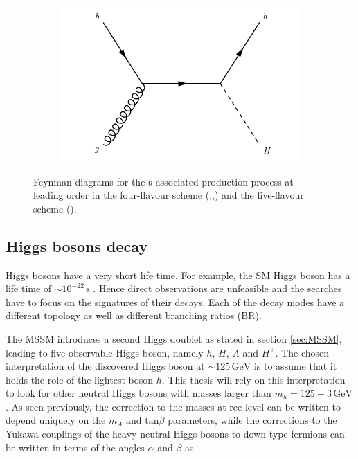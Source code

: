 \begin{figure}
\begin{subfigure}[b]{0.22\textwidth}
  \caption{\label{fig:bbh3}}
\end{subfigure}
\begin{subfigure}[b]{0.22\textwidth}
  \centering
  \includegraphics[width=\textwidth]{Images/bbh4.pdf}
  \caption{\label{fig:bbh4}}
\end{subfigure}%
\caption{Feynman diagrams for the $b$-associated production process at leading order in the four-flavour scheme (,,) and the five-flavour scheme ().}
\label{fig:bbh}
\end{figure}

\subsection{Higgs bosons decay}

Higgs bosons have a very short life time. For example, the SM Higgs boson has a life time of $\sim 10^{-22} \, \mathrm{s}$ \cite{pdg2016}. Hence direct observations are unfeasible and the searches have to focus on the signatures of their decays. Each of the decay modes have a different topology as well as different branching ratios (BR). 

The MSSM introduces a second Higgs doublet as stated in section \ref{sec:MSSM}, leading to five observable Higgs boson, namely $h$, $H$, $A$ and $H^{\pm}$. The chosen interpretation of the discovered Higgs boson at $\sim 125\, \mathrm{GeV}$ is to assume that it holds the role of the lightest boson $h$. This thesis will rely on this interpretation to look for other neutral Higgs bosons with masses larger than $m_h = 125 \pm 3 \, \mathrm{GeV}$. As seen previously, the correction to the masses at ree level can be written to depend uniquely on the $m_A$ and $\mathrm{tan} \beta$ parameters, while the corrections to the Yukawa couplings of the heavy neutral Higgs bosons to down type fermions can be written in terms of the angles $\alpha$ and $\beta$ as

